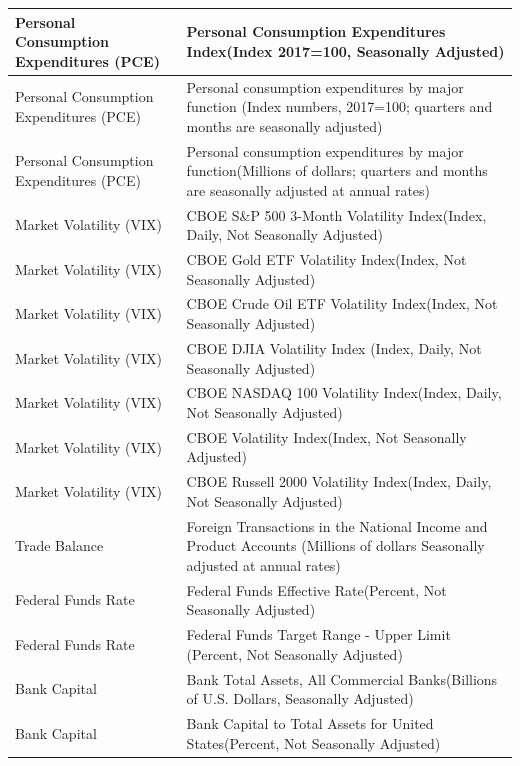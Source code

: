 \begin{center}
\begin{singlespace}
\begin{scriptsize}
\begin{longtable}{p{}|p{}}
        \hline
        Personal Consumption Expenditures (PCE)  & Personal Consumption Expenditures Index(Index 2017=100, Seasonally Adjusted) \\
        \hline
        Personal Consumption Expenditures (PCE)  & Personal consumption expenditures by major function (Index numbers, 2017=100; quarters and months are seasonally adjusted) \\
        \hline
        Personal Consumption Expenditures (PCE)  & Personal consumption expenditures by major function(Millions of dollars; quarters and months are seasonally adjusted at annual rates) \\
        \hline
        Market Volatility (VIX)  & CBOE S\&P 500 3-Month Volatility Index(Index, Daily, Not Seasonally Adjusted) \\
        \hline
        Market Volatility (VIX)  & CBOE Gold ETF Volatility Index(Index, Not Seasonally Adjusted) \\
        \hline
        Market Volatility (VIX)  & CBOE Crude Oil ETF Volatility Index(Index, Not Seasonally Adjusted) \\
        \hline
        Market Volatility (VIX)  & CBOE DJIA Volatility Index (Index, Daily, Not Seasonally Adjusted) \\
        \hline
        Market Volatility (VIX)  & CBOE NASDAQ 100 Volatility Index(Index, Daily, Not Seasonally Adjusted) \\
        \hline
        Market Volatility (VIX)  & CBOE Volatility Index(Index, Not Seasonally Adjusted) \\
        \hline
        Market Volatility (VIX)  & CBOE Russell 2000 Volatility Index(Index, Daily, Not Seasonally Adjusted) \\
        \hline
        Trade Balance  & Foreign Transactions in the National Income and Product Accounts (Millions of dollars Seasonally adjusted at annual rates) \\
        \hline
        Federal Funds Rate  & Federal Funds Effective Rate(Percent, Not Seasonally Adjusted) \\
        \hline
        Federal Funds Rate  & Federal Funds Target Range - Upper Limit (Percent, Not Seasonally Adjusted) \\
        \hline
        Bank Capital  & Bank Total Assets, All Commercial Banks(Billions of U.S. Dollars, Seasonally Adjusted) \\
        \hline
        Bank Capital  & Bank Capital to Total Assets for United States(Percent, Not Seasonally Adjusted) \\

\end{longtable}
\end{scriptsize}
\end{singlespace}
\end{center}
